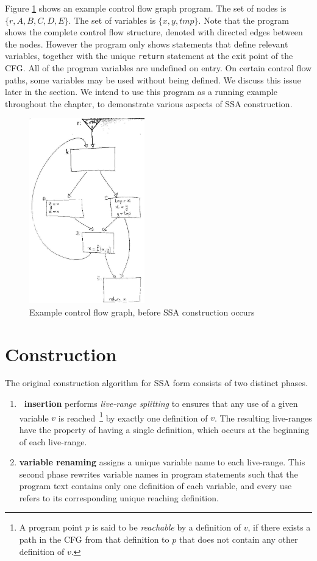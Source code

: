 Figure \ref{fig:examplecfg} shows an example control flow graph
program. The set of nodes is $\{ r, A, B, C, D, E\}$.
The set of variables is $\{ x, y, \mathit{tmp} \}$.
Note that the program shows the complete control flow structure,
denoted with directed edges between the nodes.
However the program only shows 
statements that define relevant variables, together with the
unique \texttt{return} statement at the exit point of the CFG.
All of the program variables are undefined on entry. On certain
control
flow paths, some variables may be used without being defined.
We discuss this issue later in the section.
We intend to use this program as a running example
throughout the chapter,
to demonstrate various aspects of SSA construction.


\begin{figure}
\includegraphics[width=5cm]{initial.jpg}
\caption{\label{fig:examplecfg}Example control flow graph, before
  SSA construction occurs}
\end{figure}

\section{Construction}
The original construction algorithm for SSA form 
consists of two distinct phases.
\begin{enumerate}
\item \textbf{\phiop\ insertion} performs \textit{live-range splitting} to ensures that any use of a given variable $v$ is reached~\footnote{A program point $p$ is said to be \emph{reachable} by a definition of $v$, if there exists a path in the CFG from that definition to $p$ that does not contain any other definition of $v$.}  by exactly one definition of $v$. 
The resulting live-ranges have the property of having a single definition, which occurs at the beginning of each live-range.
\item \textbf{variable renaming} assigns a unique variable name to each live-range. This second phase rewrites variable names in program statements such that the program text contains only one definition of each variable, and every use refers to its corresponding unique reaching definition.
\end{enumerate}

